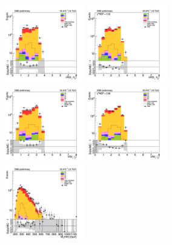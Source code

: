 \begin{figure}[tbp]
  \begin{center}
    \includegraphics[width=0.31\textwidth]{figures/mm_300_SR_april21/dR_bjets_mm_SR_prefit_plot_apr21.png}
    \includegraphics[width=0.31\textwidth]{figures/mm_300_SR_april21/dR_bjets_mm_SR_FullPostfit_plot_apr21.png}\\
    \includegraphics[width=0.31\textwidth]{figures/mm_300_SR_april21/dR_leps_mm_SR_prefit_plot_apr21.png}
    \includegraphics[width=0.31\textwidth]{figures/mm_300_SR_april21/dR_leps_mm_SR_FullPostfit_plot_apr21.png}\\
    \includegraphics[width=0.31\textwidth]{figures/mm_300_SR_april21/hhMt_mm_SR_prefit_plot_apr21.png}

\end{center}
\end{figure}
